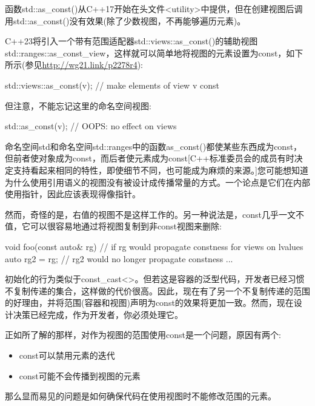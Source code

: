 函数std::as\_const()从C++17开始在头文件<utility>中提供，但在创建视图后调用std::as\_const()没有效果(除了少数视图，不再能够遍历元素)。

C++23将引入一个带有范围适配器std::views::as\_const()的辅助视图std::ranges::as\_const\_view，这样就可以简单地将视图的元素设置为const，如下所示(参见\url{http://wg21.link/p2278r4}):

\begin{cpp}
std::views::as_const(v); // make elements of view v const
\end{cpp}

但注意，不能忘记这里的命名空间视图:

\begin{cpp}
std::as_const(v); // OOPS: no effect on views
\end{cpp}

命名空间std和命名空间std::ranges中的函数as\_const()都使某些东西成为const，但前者使对象成为const，而后者使元素成为const[C++标准委员会的成员有时决定支持看起来相同的特性，即使细节不同，也可能成为麻烦的来源。]您可能想知道为什么使用引用语义的视图没有被设计成传播常量的方式。一个论点是它们在内部使用指针，因此应该表现得像指针。

然而，奇怪的是，右值的视图不是这样工作的。另一种说法是，const几乎一文不值，它可以很容易地通过将视图复制到非const视图来删除:

\begin{cpp}
void foo(const auto& rg) // if rg would propagate constness for views on lvalues
{
	auto rg2 = rg; // rg2 would no longer propagate constness
	...
}
\end{cpp}

初始化的行为类似于const\_cast<>。但若这是容器的泛型代码，开发者已经习惯不复制传递的集合，这样做的代价很高。因此，现在有了另一个不复制传递的范围的好理由，并将范围(容器和视图)声明为const的效果将更加一致。然而，现在设计决策已经完成，作为开发者，你必须处理它。


正如所了解的那样，对作为视图的范围使用const是一个问题，原因有两个:

\begin{itemize}
\item
const可以禁用元素的迭代

\item
const可能不会传播到视图的元素
\end{itemize}

那么显而易见的问题是如何确保代码在使用视图时不能修改范围的元素。

